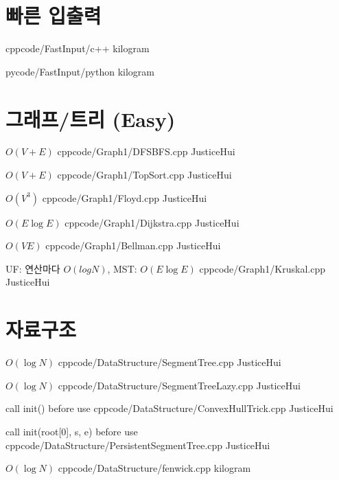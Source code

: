 \documentclass[landscape, 8pt, a4paper, twocolumn]{extarticle} %
\begin{document}
\maketitlepage

\pagebreak 

\section{빠른 입출력}

{}{}
{cpp}{code/FastInput/c++}
{kilogram}

{}{}
{py}{code/FastInput/python}
{kilogram}

\section{그래프/트리 (Easy)}

{}{$O(V+E)$}
{cpp}{code/Graph1/DFSBFS.cpp}
{JusticeHui}

{}{$O(V+E)$}
{cpp}{code/Graph1/TopSort.cpp}
{JusticeHui}

{}{$O(V^3)$}
{cpp}{code/Graph1/Floyd.cpp}
{JusticeHui}

{}{$O(E\log E)$}
{cpp}{code/Graph1/Dijkstra.cpp}
{JusticeHui}

{}{$O(VE)$}
{cpp}{code/Graph1/Bellman.cpp}
{JusticeHui}

{}{UF: 연산마다 $O(log N)$, MST: $O(E \log E)$}
{cpp}{code/Graph1/Kruskal.cpp}
{JusticeHui}

\section{자료구조}

{}{$O(\log N)$}
{cpp}{code/DataStructure/SegmentTree.cpp}
{JusticeHui}

{}{$O(\log N)$}
{cpp}{code/DataStructure/SegmentTreeLazy.cpp}
{JusticeHui}

{call init() before use}{}
{cpp}{code/DataStructure/ConvexHullTrick.cpp}
{JusticeHui}

{call init(root[0], s, e) before use}{}
{cpp}{code/DataStructure/PersistentSegmentTree.cpp}
{JusticeHui}

{}{$O(\log N)$}
{cpp}{code/DataStructure/fenwick.cpp}
{kilogram}
\end{document}
